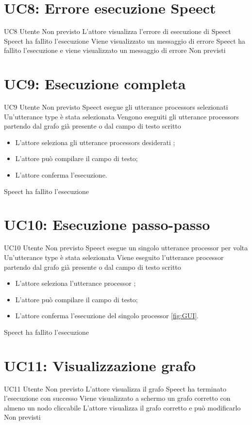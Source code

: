 \documentclass[../AnalisideiRequisiti.tex]{subfiles}
\begin{document}
	\section{UC8: Errore esecuzione Speect}
	\UserCase
	{UC8}
	{Utente}
	{Non previsto}
	{L'attore visualizza l'errore di esecuzione di Speect}
	{Speect ha fallito l'esecuzione}
	{Viene visualizzato un messaggio di errore}
	{Speect ha fallito l'esecuzione e viene visualizzato un messaggio di errore}
	{Non previsti}
	
	\section{UC9: Esecuzione completa}
	\UserCase
	{UC9}
	{Utente}
	{Non previsto}
	{Speect esegue gli utterance processors selezionati}
	{Un'utterance type è stata selezionata }
	{Vengono eseguiti gli utterance processors partendo dal grafo già presente o dal campo di testo scritto}
	{
		\begin{itemize}
			\item{} L'attore seleziona gli utterance processors desiderati ;
			\item{} L'attore può compilare il campo di testo;
			\item{} L'attore conferma l'esecuzione.
		\end{itemize}
	}
	{Speect ha fallito l'esecuzione }
	
	\section{UC10: Esecuzione passo-passo}
	\UserCase
	{UC10}
	{Utente}
	{Non previsto}
	{Speect esegue un singolo utterance processor per volta}
	{Un'utterance type è stata selezionata }
	{Viene eseguito l'utterance processor partendo dal grafo già presente o dal campo di testo scritto}
	{
		\begin{itemize}
			\item{} L'attore seleziona l'utterance processor ;
			\item{} L'attore può compilare il campo di testo;
			\item{} L'attore conferma l'esecuzione del singolo processor \ref{fig:GUI}.
		\end{itemize}
	}
	{Speect ha fallito l'esecuzione }
	
	\section{UC11: Visualizzazione grafo}
	\UserCase
	{UC11}
	{Utente}
	{Non previsto}
	{L'attore visualizza il grafo}
	{Speect ha terminato l'esecuzione con successo }
	{Viene visualizzato a schermo un grafo corretto con almeno un nodo cliccabile}
	{
		L'attore visualizza il grafo corretto e può modificarlo 
	}
	{Non previsti}
	
\end{document}
